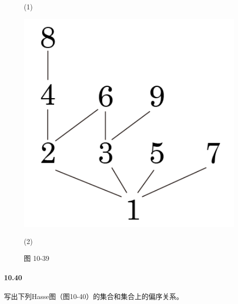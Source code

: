 \documentclass[UTF8]{ctexart}
\begin{document}
\begin{figure}[!htb]
\begin{minipage}[t]{0.153\textwidth}
        \caption*{(1)}
        \end{minipage}
        \begin{minipage}[t]{0.259\textwidth}
        \centering
        \includegraphics[width=1\textwidth]{10-39-2.png}
        \caption*{(2)}
        \end{minipage}
        \caption*{图 10-39}
    \end{figure}

\paragraph{10.40} \label{10.40}
    写出下列Hasse图（图10-40）的集合和集合上的偏序关系。
\end{document}
